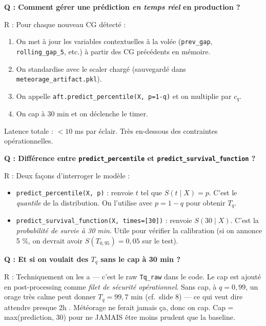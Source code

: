 \documentclass[11pt,a4paper]{article}
\begin{document}
\begin{piege}
\textbf{Q : Comment gérer une prédiction \emph{en temps réel} en production ?}

R : Pour chaque nouveau CG détecté :
\begin{enumerate}[topsep=2pt]
    \item On met à jour les variables contextuelles à la volée (\texttt{prev\_gap},
    \texttt{rolling\_gap\_5}, etc.) à partir des CG précédents en mémoire.
    \item On standardise avec le scaler chargé (sauvegardé dans
    \texttt{meteorage\_artifact.pkl}).
    \item On appelle \texttt{aft.predict\_percentile(X, p=1-q)} et on multiplie par $c_q$.
    \item On cap à 30 min et on déclenche le timer.
\end{enumerate}
Latence totale : $< 10$ ms par éclair. Très en-dessous des contraintes opérationnelles.
\end{piege}

\begin{piege}
\textbf{Q : Différence entre \texttt{predict\_percentile} et \texttt{predict\_survival\_function} ?}

R : Deux façons d'interroger le modèle :
\begin{itemize}[topsep=2pt]
    \item \texttt{predict\_percentile(X, p)} : renvoie $t$ tel que $S(t \mid X) = p$.
    C'est le \emph{quantile} de la distribution. On l'utilise avec $p = 1 - q$ pour
    obtenir $T_q$.
    \item \texttt{predict\_survival\_function(X, times=[30])} : renvoie $S(30 \mid X)$.
    C'est la \emph{probabilité de survie à 30 min}. Utile pour vérifier la calibration
    (si on annonce 5 \%, on devrait avoir $S(T_{0,95}) = 0{,}05$ sur le test).
\end{itemize}
\end{piege}

\begin{piege}
\textbf{Q : Et si on voulait des $T_q$ sans le cap à 30 min ?}

R : Techniquement on les a — c'est le \og raw \fg{} \texttt{Tq\_raw} dans le code. Le cap
est ajouté en post-processing comme \emph{filet de sécurité opérationnel}. Sans cap, à
$q = 0{,}99$, un orage très calme peut donner $T_q = 99{,}7$ min (cf.\ slide 8) — ce qui
veut dire \og attendre presque 2h \fg{}. Météorage ne ferait jamais ça, donc on cap.
Cap = max(prediction, 30) pour ne JAMAIS être moins prudent que la baseline.
\end{piege}
\end{document}
